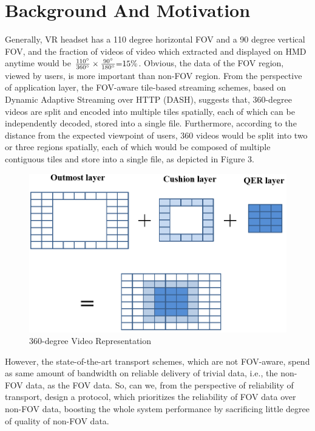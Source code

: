\section{Background And Motivation}

	Generally, VR headset has a 110 degree horizontal FOV and a 90 degree vertical FOV, and the fraction of videos of video which extracted and displayed on HMD anytime would be $\frac{{110^\circ }}{{360^\circ }} \times \frac{{90^\circ }}{{180^\circ }}{\rm{ = }}15{\rm{\% }}$. Obvious, the data of the FOV region, viewed by users, is more important than non-FOV region.
	From the perspective of application layer, the FOV-aware tile-based streaming schemes, based on Dynamic Adaptive Streaming over HTTP (DASH), suggests that, 360-degree videos are split and encoded into multiple tiles spatially, each of which can be independently decoded, stored into a single file. Furthermore, according to the distance from the expected viewpoint of users, 360 videos would be split into two or three regions spatially, each of which would be composed of multiple contiguous tiles and store into a single file, as depicted in Figure 3.
	
	\begin{figure}[ht]
		\centering
		\includegraphics[scale=0.2]{paper_figs/tileSplit.png}
		\caption{360-degree Video Representation}
		\label{paper_figs:pathdemo}
	\end{figure}	
	
	
	However, the state-of-the-art transport schemes, which are not FOV-aware, spend as same amount of bandwidth on reliable delivery of trivial data, i.e., the non-FOV data, as the FOV data. So, can we, from the perspective of reliability of transport, design a protocol, which prioritizes the reliability of FOV data over non-FOV data, boosting the whole system performance by sacrificing little degree of quality of non-FOV data.

